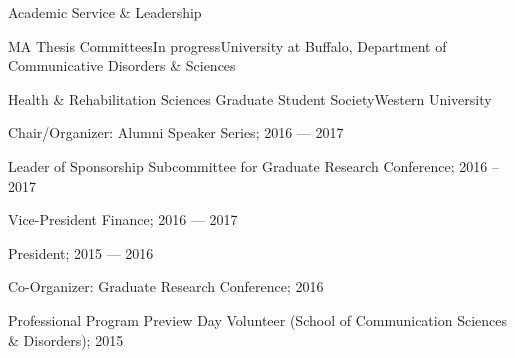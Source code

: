 \documentclass{resume} %
\begin{document}
\begin{rSection}{Academic Service \& Leadership}
\begin{rSubsection}{MA Thesis Committees}{In progress}{University at Buffalo, Department of Communicative Disorders \& Sciences}{}
\begin{rSubsection}{Health \& Rehabilitation Sciences Graduate Student Society}{}{Western University}{}
	\item Chair/Organizer: Alumni Speaker Series; 2016 --- 2017
	\item Leader of Sponsorship Subcommittee for Graduate Research Conference; 2016 --2017
	\item Vice-President Finance; 2016 --- 2017
	\item President; 2015 --- 2016
	\item Co-Organizer: Graduate Research Conference; 2016
	\item Professional Program Preview Day Volunteer (School of Communication Sciences \& Disorders); 2015
\end{rSubsection}

%	
%	
%	
%	
%	
%	



\end{rSubsection}
\end{rSection}
\end{document}
